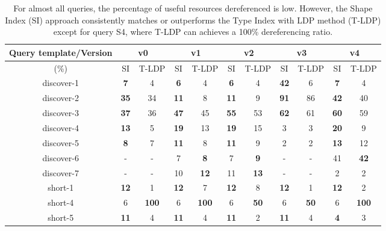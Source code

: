 \begin{table}[htbp]
	\begin{center}
		\begin{tabular}{|c|c|c|c|c|c|c|c|c|c|c|}
			\hline
            \multicolumn{1}{|c}{Query template/Version} & \multicolumn{2}{|c|}{v0} & \multicolumn{2}{|c|}{v1} & \multicolumn{2}{|c|}{v2} & \multicolumn{2}{|c|}{v3} & \multicolumn{2}{|c|}{v4} \\
			\hline
            (\%) & SI  & T-LDP & SI & T-LDP & SI & T-LDP& SI & T-LDP & SI & T-LDP \\
            \hline
			discover-1 & \textbf{7} & 4 & \textbf{6} & 4 & \textbf{6} & 4 & \textbf{42} & 6 & \textbf{7} & 4 \\
            \hline
            discover-2 & \textbf{35} & 34 & \textbf{11} & 8 & \textbf{11} & 9 & \textbf{91} & 86 & \textbf{42} & 40 \\
			\hline
            discover-3 & \textbf{37} & 36 & \textbf{47} & 45 & \textbf{55} & 53 & \textbf{62} & 61 & \textbf{60} & 59 \\
			\hline
            discover-4 & \textbf{13} & 5 & \textbf{19} & 13 & \textbf{19} & 15 & 3 & 3 & \textbf{20} & 9 \\
			\hline
            discover-5 & \textbf{8} & 7 & \textbf{11} & 8 & \textbf{11} & 9 & 2 & 2 & \textbf{13} & 12 \\
			\hline
            discover-6 & - & - & 7 & \textbf{8} & 7 & \textbf{9} & - & - & 41 & \textbf{42} \\
			\hline
            discover-7 & - & - & 10 & \textbf{12} & 11 & \textbf{13} & - & - & 2 & 2 \\
			\hline
            short-1 & \textbf{12} & 1 & \textbf{12} & 7 & \textbf{12} & 8 & \textbf{12} & 1 & \textbf{12} & 2 \\
			\hline
            short-4 & 6 & \textbf{100} & 6 & \textbf{100} & 6 & \textbf{50} & 6 & \textbf{50} & 6 & \textbf{100} \\
			\hline
            short-5 & \textbf{11} & 4 & \textbf{11} & 4 & \textbf{11} & 2 & \textbf{11} & 4 & \textbf{4} & 3 \\
			\hline
		\end{tabular}
	\end{center}
	\caption{
        For almost all queries, the percentage of useful resources dereferenced is low. 
        However, the Shape Index (SI) approach consistently matches or outperforms the Type Index with LDP method (T-LDP) except for query S4, where T-LDP can achieves a 100\% dereferencing ratio.
        }
	\label{tab:ratioUsefulResources}
\end{table}